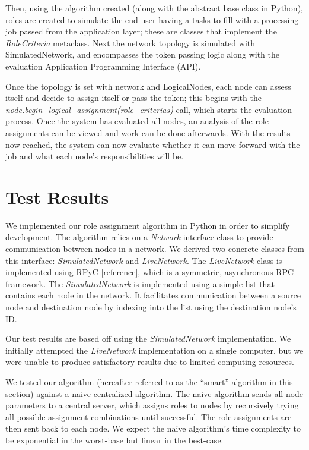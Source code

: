 \documentclass[11pt]{article}
\begin{document}
\begin{multicols}{2}
Then, using the algorithm created (along with the abstract base class in Python), roles are created to simulate the end user having a tasks to fill with a processing job passed from the application layer; these are classes that implement the \textit{RoleCriteria} metaclass.  Next the network topology is simulated with SimulatedNetwork, and encompasses the token passing logic along with the evaluation Application Programming Interface (API).

Once the topology is set with network and LogicalNodes, each node can assess itself and decide to assign itself or pass the token; this begins with the \textit{node.begin\_logical\_assignment(role\_criterias)} call, which starts the evaluation process.  Once the system has evaluated all nodes, an analysis of the role assignments can be viewed and work can be done afterwards.  With the results now reached, the system can now evaluate whether it can move forward with the job and what each node's responsibilities will be.
\vfill
\section{Test Results}

We implemented our role assignment algorithm in Python in order to simplify development. The algorithm relies on a \textit{Network} interface class to provide communication between nodes in a network. We derived two concrete classes from this interface: \textit{SimulatedNetwork} and \textit{LiveNetwork}. The \textit{LiveNetwork} class is implemented using RPyC [reference], which is a symmetric, asynchronous RPC framework. The \textit{SimulatedNetwork} is implemented using a simple list that contains each node in the network. It facilitates communication between a source node and destination node by indexing into the list using the destination node's ID.

Our test results are based off using the \textit{SimulatedNetwork} implementation. We initially attempted the \textit{LiveNetwork} implementation on a single computer, but we were unable to produce satisfactory results due to limited computing resources.

We tested our algorithm (hereafter referred to as the ``smart'' algorithm in this section) against a naive centralized algorithm. The naive algorithm sends all node parameters to a central server, which assigns roles to nodes by recursively trying all possible assignment combinations until successful. The role assignments are then sent back to each node. We expect the naive algorithm's time complexity to be exponential in the worst-base but linear in the best-case.


\end{multicols}
\end{document}
